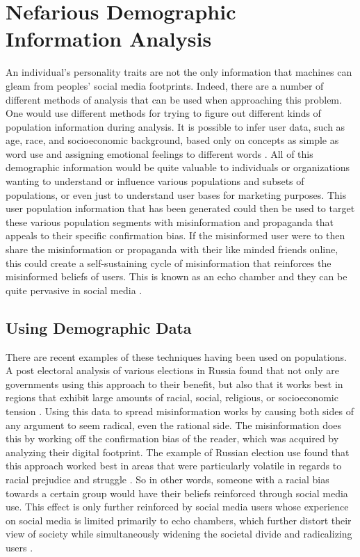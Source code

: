 \documentclass[sigconf]{acmart}
\begin{document}
\section{Nefarious Demographic Information Analysis}

An individual's personality traits are not the only information that machines can gleam from peoples' social media footprints. Indeed, there are a number of different methods of analysis that can be used when approaching this problem. One would use different methods for trying to figure out different kinds of population information during analysis. It is possible to infer user data, such as age, race, and socioeconomic background, based only on concepts as simple as word use and assigning emotional feelings to different words \cite{Preotiuc-Pietro2015}. All of this demographic information would be quite valuable to individuals or organizations wanting to understand or influence various populations and subsets of populations, or even just to understand user bases for marketing purposes. This user population information that has been generated could then be used to target these various population segments with misinformation and propaganda that appeals to their specific confirmation bias. If the misinformed user were to then share the misinformation or propaganda with their like minded friends online, this could create a self-sustaining cycle of misinformation that reinforces the misinformed beliefs of users. This is known as an echo chamber and they can be quite pervasive in social media \cite{Du2017}.

\subsection{Using Demographic Data}

There are recent examples of these techniques having been used on populations. A post electoral analysis of various elections in Russia found that not only are governments using this approach to their benefit, but also that it works best in regions that exhibit large amounts of racial, social, religious, or socioeconomic tension \cite{Goodnow2014}. Using this data to spread misinformation works by causing both sides of any argument to seem radical, even the rational side. The misinformation does this by working off the confirmation bias of the reader, which was acquired by analyzing their digital footprint. The example of Russian election use found that this approach worked best in areas that were particularly volatile in regards to racial prejudice and struggle \cite{Goodnow2014}. So in other words, someone with a racial bias towards a certain group would have their beliefs reinforced through social media use. This effect is only further reinforced by social media users whose experience on social media is limited primarily to echo chambers, which further distort their view of society while simultaneously widening the societal divide and radicalizing users \cite{Du2017}. 
\end{document}
